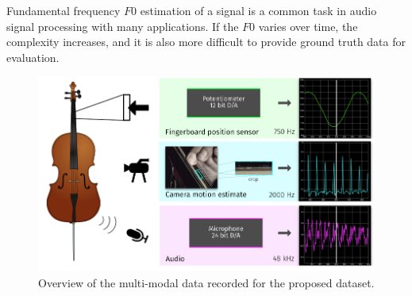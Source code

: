 Fundamental frequency \(F0\) estimation of a signal is a common task in audio signal processing with many applications. 
If the $F0$ varies over time, the complexity increases, and it is also more difficult to provide ground truth data for evaluation.

\begin{figure}[h]
  \centering
  \includegraphics[width=\textwidth]{Chapters/04_Data/figures/teaser.pdf}
  \caption{Overview of the multi-modal data recorded for the proposed dataset.}
\label{fig:teaser_hdf0}
\end{figure}

